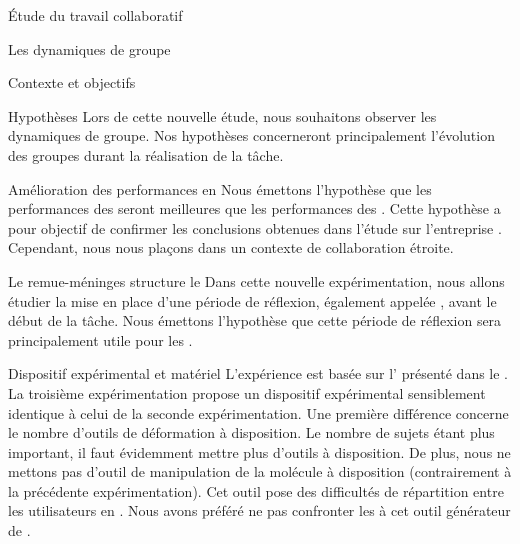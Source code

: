 \documentclass[myfrancais]{mythesis}
\begin{document}
\begin{mypart}{Étude du travail collaboratif}
\begin{mychapter}{Les dynamiques de groupe}
\begin{mysection}{Contexte et objectifs}
				\begin{mysubsection}{Hypothèses}
					Lors de cette nouvelle étude, nous souhaitons observer les dynamiques de groupe.
					Nos hypothèses concerneront principalement l'évolution des groupes durant la réalisation de la tâche.
					\begin{myparagraph}{ Amélioration des performances en }
						Nous émettons l'hypothèse que les performances des  seront meilleures que les performances des .
						Cette hypothèse a pour objectif de confirmer les conclusions obtenues dans l'étude sur l'entreprise \myHawthorne.
						Cependant, nous nous plaçons dans un contexte de collaboration étroite.
					\end{myparagraph}
					\begin{myparagraph}{ Le remue-méninges structure le }
						Dans cette nouvelle expérimentation, nous allons étudier la mise en place d'une période de réflexion, également appelée , avant le début de la tâche.
						Nous émettons l'hypothèse que cette période de réflexion sera principalement utile pour les .
					\end{myparagraph}
				\end{mysubsection}
			\end{mysection}
			\begin{mysection}{Dispositif expérimental et matériel}
				L'expérience est basée sur l' présenté dans le .
				La troisième expérimentation propose un dispositif expérimental sensiblement identique à celui de la seconde expérimentation.
				Une première différence concerne le nombre d'outils de déformation à disposition.
				Le nombre de sujets étant plus important, il faut évidemment mettre plus d'outils à disposition.
				De plus, nous ne mettons pas d'outil de manipulation de la molécule à disposition (contrairement à la précédente expérimentation).
				Cet outil pose des difficultés de répartition entre les utilisateurs en .
				Nous avons préféré ne pas confronter les  à cet outil générateur de .


\end{mysection}
\end{mychapter}
\end{mypart}
\end{document}
